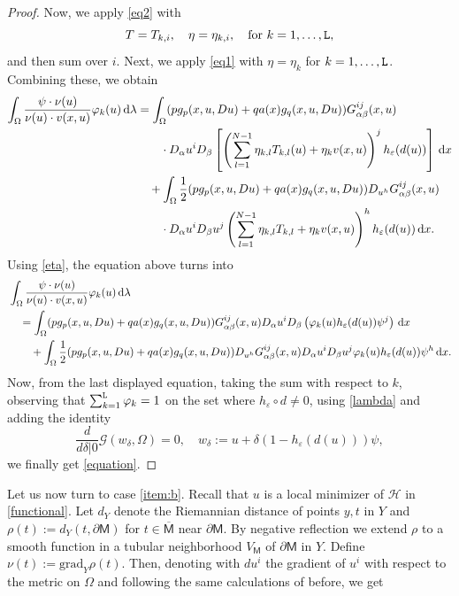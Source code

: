 \documentclass[a4paper]{amsart}
\theoremstyle{plain}  %
\numberwithin{equation}{section}
\def\dx{\,{\rm d}x}
\def \d{\,{\rm d}}
\newcommand{\mm}{\mathsf{M}}
\newcommand{\tx}[1]{\textnormal{\texttt{#1}}}
\begin{document}
\begin{proof}
Now, we apply \eqref{eq2} with
\[
T = T_{k,i}, \quad \eta = \eta_{k,i}, \quad \text{for } k = 1, \dots, \tx{L},
\]
and then sum over \(i\). Next, we apply \eqref{eq1} with \(\eta = \eta_k\) for \(k = 1, \dots, \tx{L}\). Combining these, we obtain
\begin{align*}
  \int_{\Omega} \frac{\psi \cdot \nu(u)}{\nu(u) \cdot v(x,u)} \varphi_k(u) \d\lambda    & =  \int_\Omega (pg_p(x,u,Du) + qa(x) g_q(x,u,Du)) G^{ij}_{\alpha \beta} (x,u) \\ & \qquad \cdot  D_\alpha u^i D_\beta \left [\left ( \sum_{l=1}^{N-1} \eta_{k,l}T_{k,l}(u) + \eta_k v(x,u) \right )^j h_\varepsilon (d(u)) \right ] \dx \\ & \quad + \int_{\Omega} \frac{1}{2}(pg_p(x,u,Du) + qa(x) g_q(x,u,Du))D_{u^h}G^{ij}_{\alpha \beta}(x,u) \\ & \qquad \cdot D_\alpha u^i D_\beta u^j \left ( \sum_{l=1}^{N-1} \eta_{k,l} T_{k,l} + \eta_k v(x,u)\right )^h h_\varepsilon (d(u)) \dx.
\end{align*}
Using \eqref{eta}, the equation above turns into
\begin{align*}
   & \int_{\Omega} \frac{\psi \cdot \nu(u)}{\nu(u) \cdot v(x,u)} \varphi_k(u) \d\lambda \\ & \quad = \int_\Omega (pg_p(x,u,Du) + qa(x)g_q(x,u,Du))G^{ij}_{\alpha \beta} (x,u) D_\alpha u^i D_\beta \left ( \varphi_k(u) h_\varepsilon (d(u)) \psi^j\right ) \dx \\ & \qquad + \int_{\Omega} \frac{1}{2}(pg_p(x,u,Du) + qa(x)g_q(x,u,Du))D_{u^h}G^{ij}_{\alpha \beta}(x,u) D_\alpha u^i D_\beta u^j \varphi_k(u) h_\varepsilon (d(u))  \psi^h \dx.
\end{align*}
Now, from the last displayed equation, taking the sum with respect to $k$, observing that $\sum_{k=1}^{\tx{L}} \varphi_k =1$ on the set where $h_\varepsilon \circ d \neq 0$, using \eqref{lambda} and adding the identity
$$ \frac{d}{d\delta|0}\mathcal{G}(w_\delta, \Omega) =0, \quad w_\delta := u + \delta(1-h_\varepsilon(d(u))) \psi,$$
we finally get \eqref{equation}.
\end{proof}
\noindent
Let us now turn to case \ref{item:b}. Recall that $u$ is a local minimizer of $\mathcal{H}$ in \eqref{functional}. Let $d_Y$ denote the Riemannian distance of points $y,t$ in $Y$ and $\rho(t):=d_Y(t,\partial \mm)$ for $t \in \overline{\mm}$ near $\partial \mm$. By negative reflection we extend $\rho$ to a smooth function in a tubular neighborhood  $V_\mm$ of $\partial \mm$ in $Y$. Define $\nu(t):=  \text{grad}_Y\rho(t)$. Then, denoting with $du^i$ the gradient of $u^i$ with respect  to the metric  on $\Omega$ and following the same calculations of before, we get
\end{document}

